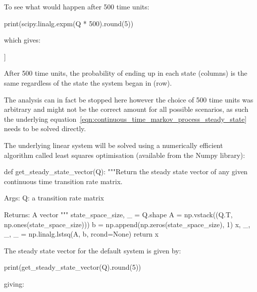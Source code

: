 To see what would happen after 500 time units:

\begin{pyin}
print(scipy.linalg.expm(Q * 500).round(5))
\end{pyin}

which gives:

\begin{pyout}
[[0.03431 0.08577 0.10722 0.13402 0.16752 0.2094  0.26176]
 [0.03431 0.08577 0.10722 0.13402 0.16752 0.2094  0.26176]
 [0.03431 0.08577 0.10722 0.13402 0.16752 0.2094  0.26176]
 [0.03431 0.08577 0.10722 0.13402 0.16752 0.2094  0.26176]
 [0.03431 0.08577 0.10722 0.13402 0.16752 0.2094  0.26176]
 [0.03431 0.08577 0.10722 0.13402 0.16752 0.2094  0.26176]
 [0.03431 0.08577 0.10722 0.13402 0.16752 0.2094  0.26176]]
\end{pyout}

After 500 time units, the probability of ending up in each state (columns) is
the same regardless of the state the system began in (row).

The analysis can in fact be stopped here
however the choice of 500 time units was arbitrary and might not be the correct
amount for all possible scenarios, as such the
underlying equation~\ref{eqn:continuous_time_markov_process_steady_state}
needs to be solved directly.

The underlying linear system will be solved using a numerically efficient
algorithm called least squares optimisation (available from the
Numpy library):

\begin{pyin}
def get_steady_state_vector(Q):
    """Return the steady state vector of any given continuous time
    transition rate matrix.

    Args:
       Q: a transition rate matrix

    Returns:
        A vector
    """
    state_space_size, _ = Q.shape
    A = np.vstack((Q.T, np.ones(state_space_size)))
    b = np.append(np.zeros(state_space_size), 1)
    x, _, _, _ = np.linalg.lstsq(A, b, rcond=None)
    return x
\end{pyin}

The steady state vector for the default system is given by:

\begin{pyin}
print(get_steady_state_vector(Q).round(5))
\end{pyin}

giving:

\begin{pyout}
[0.03431 0.08577 0.10722 0.13402 0.16752 0.2094  0.26176]
\end{pyout}

